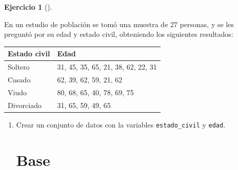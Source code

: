 \documentclass[
  spanish,
  a4paper,
]{scrreport}
\theoremstyle{definition}
\newtheorem{exercise}{Ejercicio}[chapter]
\theoremstyle{remark}
\begin{document}
\begin{exercise}[]\protect\hypertarget{exr-frecuencias-graficos-estado-civil-edades}{}\label{exr-frecuencias-graficos-estado-civil-edades}

En un estudio de población se tomó una muestra de 27 personas, y se les
preguntó por su edad y estado civil, obteniendo los siguientes
resultados:

\begin{longtable}[]{@{}ll@{}}
\toprule\noalign{}
Estado civil & Edad \\
\midrule\noalign{}
\endhead
\bottomrule\noalign{}
\endlastfoot
Soltero & 31, 45, 35, 65, 21, 38, 62, 22, 31 \\
Casado & 62, 39, 62, 59, 21, 62 \\
Viudo & 80, 68, 65, 40, 78, 69, 75 \\
Divorciado & 31, 65, 59, 49, 65 \\
\end{longtable}

\begin{enumerate}
\def\labelenumi{\alph{enumi}.}
\item
  Crear un conjunto de datos con la variables \texttt{estado\_civil} y
  \texttt{edad}.

  \begin{tcolorbox}[enhanced jigsaw, colback=white, coltitle=black, toprule=.15mm, rightrule=.15mm, opacitybacktitle=0.6, opacityback=0, bottomtitle=1mm, toptitle=1mm, titlerule=0mm, breakable, leftrule=.75mm, title=\textcolor{quarto-callout-tip-color}{\faLightbulb}\hspace{0.5em}{Solución}, arc=.35mm, left=2mm, bottomrule=.15mm, colframe=quarto-callout-tip-color-frame, colbacktitle=quarto-callout-tip-color!10!white]

  \section{Base}


\end{tcolorbox}
\end{enumerate}
\end{exercise}
\end{document}
